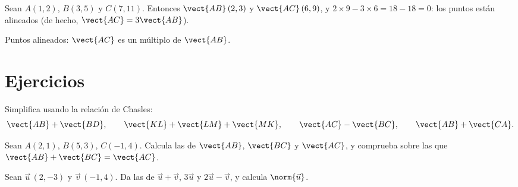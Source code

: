 \begin{example}\label{ex:g10:vectors:alignment}
Sean $A(1, 2)$, $B(3, 5)$ y $C(7, 11)$. Entonces $\vect{AB}\,(2, 3)$ y
$\vect{AC}\,(6, 9)$, y $2 \times 9 - 3 \times 6 = 18 - 18 = 0$: los puntos
están alineados (de hecho, $\vect{AC} = 3\vect{AB}$).
\end{example}

\begin{omfigure}

{\small Puntos alineados: $\vect{AC}$ es un múltiplo de $\vect{AB}$.}
\end{omfigure}

\section{Ejercicios}

\begin{exercise}[$\star$]\label{exo:g10:vectors:1}
Simplifica usando la relación de Chasles:
\[
\vect{AB} + \vect{BD}, \qquad
\vect{KL} + \vect{LM} + \vect{MK}, \qquad
\vect{AC} - \vect{BC}, \qquad
\vect{AB} + \vect{CA}.
\]
\end{exercise}

\begin{exercise}[$\star$]\label{exo:g10:vectors:2}
Sean $A(2, 1)$, $B(5, 3)$, $C(-1, 4)$. Calcula las  de
$\vect{AB}$, $\vect{BC}$ y $\vect{AC}$, y comprueba sobre las 
que $\vect{AB} + \vect{BC} = \vect{AC}$.
\end{exercise}

\begin{exercise}[$\star$]\label{exo:g10:vectors:3}
Sean $\vec u\,(2, -3)$ y $\vec v\,(-1, 4)$. Da las  de
$\vec u + \vec v$, $3\vec u$ y $2\vec u - \vec v$, y calcula
$\norm{\vec u}$.
\end{exercise}

